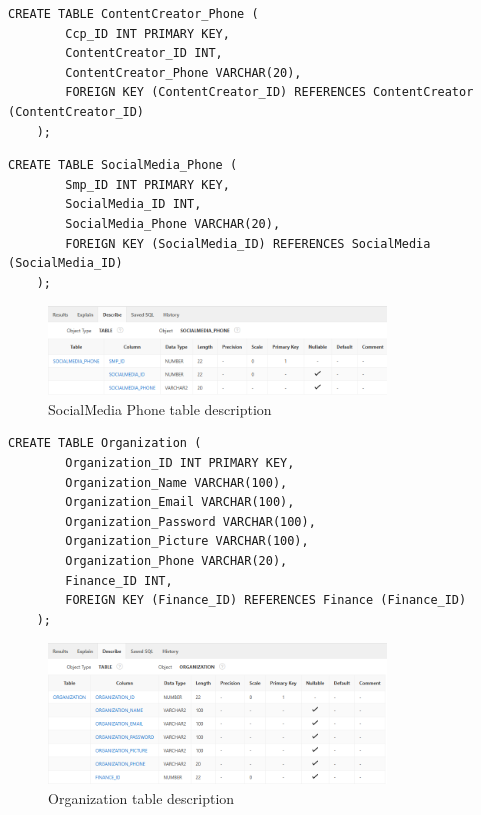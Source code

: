 \begin{lstlisting}[caption={Create ContentCreator Phone table}, label={lst:create_contentcreator_phone}]
    CREATE TABLE ContentCreator_Phone (
        Ccp_ID INT PRIMARY KEY,
        ContentCreator_ID INT,
        ContentCreator_Phone VARCHAR(20),
        FOREIGN KEY (ContentCreator_ID) REFERENCES ContentCreator (ContentCreator_ID)
    );
    \end{lstlisting}
\clearpage
\begin{lstlisting}[caption={Create SocialMedia Phone table}, label={lst:create_socialmedia_phone}]
    CREATE TABLE SocialMedia_Phone (
        Smp_ID INT PRIMARY KEY,
        SocialMedia_ID INT,
        SocialMedia_Phone VARCHAR(20),
        FOREIGN KEY (SocialMedia_ID) REFERENCES SocialMedia (SocialMedia_ID)
    );
    \end{lstlisting}
\begin{figure}[H]
    \centering
    \includegraphics[width=0.8\textwidth]{images/TableDesc/SOCIALMEDIA_PHONE.png}
    \caption{SocialMedia Phone table description}
    \label{fig:socialmedia_phone_table}
\end{figure}
\begin{lstlisting}[caption={Create Organization table}, label={lst:create_organization}]
    CREATE TABLE Organization (
        Organization_ID INT PRIMARY KEY,
        Organization_Name VARCHAR(100),
        Organization_Email VARCHAR(100),
        Organization_Password VARCHAR(100),
        Organization_Picture VARCHAR(100),
        Organization_Phone VARCHAR(20),
        Finance_ID INT,
        FOREIGN KEY (Finance_ID) REFERENCES Finance (Finance_ID)
    );
    \end{lstlisting}
\begin{figure}[H]
    \centering
    \includegraphics[width=0.8\textwidth]{images/TableDesc/ORGANIZATION.png}
    \caption{Organization table description}
    \label{fig:organization_table}
\end{figure}
